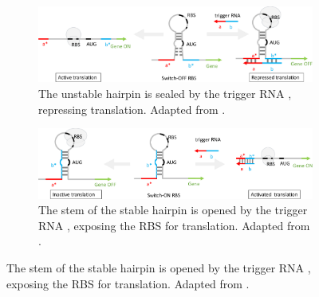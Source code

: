 \documentclass[12pt,notitlepage]{article}
\let\cite\citep
\begin{document}
\begin{figure}[!p]
    \centering
    
    \begin{subfigure}{\linewidth}
        \centering
        \includegraphics[width=\linewidth]{xor_ribocomputing/switch_off}
        \caption{%
            The unstable hairpin is sealed by 
            the trigger RNA ,
            repressing translation.
            Adapted from
            \cite[\href{https://www.nature.com/articles/s41589-019-0388-1/figures/1}{Fig.~1c}]{Kim2019}.
        }
        \label{f:switch_off_RBS}
    \end{subfigure}
    
    \vspace{1.5\baselineskip}
    
    \begin{subfigure}{\linewidth}
        \centering
        \includegraphics[width=\linewidth]{xor_ribocomputing/switch_on}
        \caption{%
            The stem of the stable hairpin 
            is opened by the trigger RNA , 
            exposing the RBS for translation.
            Adapted from
            \cite[\href{https://www.sciencedirect.com/science/article/pii/S0092867414012896}{Fig.~1b}]{Green2014}.
        }
        \label{f:switch_on_RBS}
    \end{subfigure}
    
    \vspace{1.5\baselineskip}
    

\end{figure}
\end{document}
